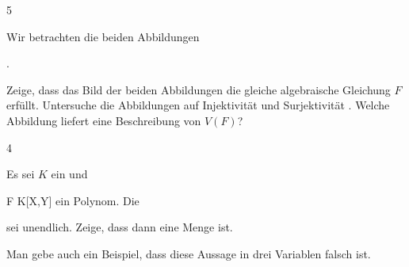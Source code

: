 {5}
{





Wir betrachten die beiden Abbildungen

 { . }

Zeige, dass das Bild der beiden Abbildungen die gleiche algebraische Gleichung $F$ erfüllt. Untersuche die Abbildungen auf Injektivität und Surjektivität
 {} {.}
Welche Abbildung liefert eine  Beschreibung von $V(F)$?





}
{} {}

{4}
{





Es sei $K$ ein
und

\mavergleichskette
{\vergleichskette
{ F
}
{ \in }{ K[X,Y]
}
{  }{
}
{    }{
}
{   }{
}
}
{}{}{}
ein
Polynom. Die

 sei unendlich. Zeige, dass dann
 eine
Menge ist.





}
{Man gebe auch ein Beispiel, dass diese Aussage in drei Variablen falsch ist.} {}
